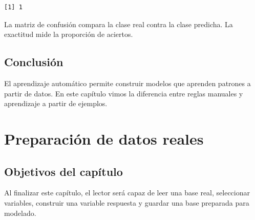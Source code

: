 \documentclass[
  spanish,
  11pt,
  letterpaper,
]{book}
\newenvironment{Shaded}{}{}
\newcommand{\FunctionTok}[1]{\textcolor[rgb]{0.44,0.26,0.76}{#1}}
\newcommand{\NormalTok}[1]{\textcolor[rgb]{0.14,0.16,0.18}{#1}}
\newcommand{\SpecialCharTok}[1]{\textcolor[rgb]{0.00,0.36,0.77}{#1}}
\begin{document}
\begin{Shaded}
\end{Shaded}

\begin{verbatim}
[1] 1
\end{verbatim}

\begin{tcolorbox}[enhanced jigsaw, arc=.35mm, bottomrule=.15mm, bottomtitle=1mm, breakable, colback=white, colbacktitle=quarto-callout-tip-color!10!white, colframe=quarto-callout-tip-color-frame, coltitle=black, left=2mm, leftrule=.75mm, opacityback=0, opacitybacktitle=0.6, rightrule=.15mm, title=\textcolor{quarto-callout-tip-color}{\faLightbulb}\hspace{0.5em}{Interpretación del resultado}, titlerule=0mm, toprule=.15mm, toptitle=1mm]

La matriz de confusión compara la clase real contra la clase predicha.
La exactitud mide la proporción de aciertos.

\end{tcolorbox}

\section{Conclusión}\label{conclusiuxf3n}

El aprendizaje automático permite construir modelos que aprenden
patrones a partir de datos. En este capítulo vimos la diferencia entre
reglas manuales y aprendizaje a partir de ejemplos.


\chapter{Preparación de datos
reales}\label{preparaciuxf3n-de-datos-reales}

\section{Objetivos del capítulo}\label{objetivos-del-capuxedtulo-1}

Al finalizar este capítulo, el lector será capaz de leer una base real,
seleccionar variables, construir una variable respuesta y guardar una
base preparada para modelado.
\end{document}
